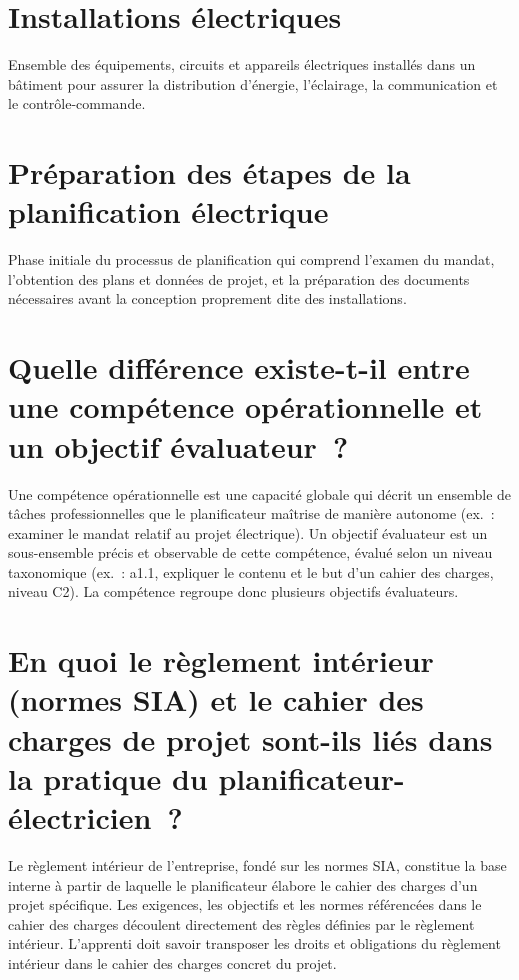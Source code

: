 \documentclass[a4paper,12pt,answers,addpoints]{exam}
\begin{document}
\begin{questions}
\begin{parts}
			\part[1]{Installations électriques}
			\begin{solution}
				Ensemble des équipements, circuits et appareils électriques installés dans un bâtiment pour assurer la distribution d'énergie, l'éclairage, la communication et le contrôle-commande.
			\end{solution}
			
			\part[1]{Préparation des étapes de la planification électrique}
			\begin{solution}
				Phase initiale du processus de planification qui comprend l'examen du mandat, l'obtention des plans et données de projet, et la préparation des documents nécessaires avant la conception proprement dite des installations.
			\end{solution}
			
		\end{parts}
		
		
		\begin{parts}
			
			\part[2]{Quelle différence existe-t-il entre une compétence opérationnelle et un objectif évaluateur~?}
			\begin{solution}
				Une compétence opérationnelle est une capacité globale qui décrit un ensemble de tâches professionnelles que le planificateur maîtrise de manière autonome (ex.~: examiner le mandat relatif au projet électrique). Un objectif évaluateur est un sous-ensemble précis et observable de cette compétence, évalué selon un niveau taxonomique (ex.~: a1.1, expliquer le contenu et le but d'un cahier des charges, niveau C2). La compétence regroupe donc plusieurs objectifs évaluateurs.
			\end{solution}
			
			\part[2]{En quoi le règlement intérieur (normes SIA) et le cahier des charges de projet sont-ils liés dans la pratique du planificateur-électricien~?}
			\begin{solution}
				Le règlement intérieur de l'entreprise, fondé sur les normes SIA, constitue la base interne à partir de laquelle le planificateur élabore le cahier des charges d'un projet spécifique. Les exigences, les objectifs et les normes référencées dans le cahier des charges découlent directement des règles définies par le règlement intérieur. L'apprenti doit savoir transposer les droits et obligations du règlement intérieur dans le cahier des charges concret du projet.
			\end{solution}
			

\end{parts}
\end{questions}
\end{document}
